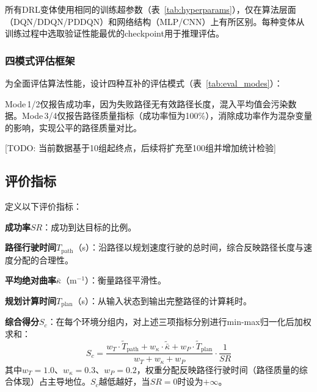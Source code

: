 \documentclass[twocolumn]{elsarticle}
\begin{document}
所有DRL变体使用相同的训练超参数（表~\ref{tab:hyperparams}），仅在算法层面（DQN/DDQN/PDDQN）和网络结构（MLP/CNN）上有所区别。每种变体从训练过程中选取验证性能最优的checkpoint用于推理评估。

\subsubsection{四模式评估框架}

为全面评估算法性能，设计四种互补的评估模式（表~\ref{tab:eval_modes}）：

\begin{table}[t]
\centering
\caption{四模式评估框架}
\label{tab:eval_modes}
%
\end{table}

Mode\,1/2仅报告成功率，因为失败路径无有效路径长度，混入平均值会污染数据。Mode\,3/4仅报告路径质量指标（成功率恒为100\%），消除成功率作为混杂变量的影响，实现公平的路径质量对比。

[TODO: 当前数据基于10组起终点，后续将扩充至100组并增加统计检验]

\subsection{评价指标}

定义以下评价指标：

\textbf{成功率}$SR$：成功到达目标的比例。

\textbf{路径行驶时间}$T_{\text{path}}$（s）：沿路径以规划速度行驶的总时间，综合反映路径长度与速度分配的合理性。

\textbf{平均绝对曲率}$\bar{\kappa}$（m$^{-1}$）：衡量路径平滑性。

\textbf{规划计算时间}$T_{\text{plan}}$（s）：从输入状态到输出完整路径的计算耗时。

\textbf{综合得分}$S_c$：在每个环境分组内，对上述三项指标分别进行min-max归一化后加权求和：
\begin{equation}
  S_c = \frac{w_T \cdot \tilde{T}_{\text{path}} + w_\kappa \cdot \tilde{\bar{\kappa}} + w_P \cdot \tilde{T}_{\text{plan}}}{w_T + w_\kappa + w_P} \cdot \frac{1}{SR}
\end{equation}
其中$w_T=1.0$、$w_\kappa=0.3$、$w_P=0.2$，权重分配反映路径行驶时间（路径质量的综合体现）占主导地位。$S_c$越低越好，当$SR=0$时设为$+\infty$。
\end{document}
